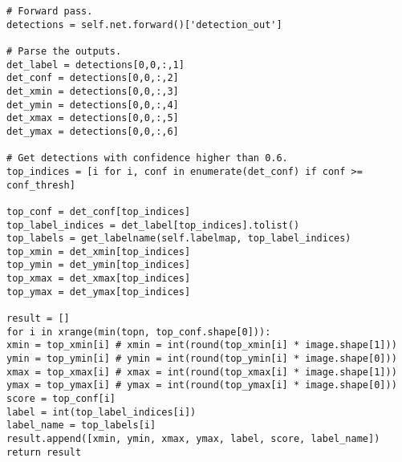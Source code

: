 \documentclass[12pt,paper=a4]{report}
\begin{document}
\begin{lstlisting}
# Forward pass.
detections = self.net.forward()['detection_out']

# Parse the outputs.
det_label = detections[0,0,:,1]
det_conf = detections[0,0,:,2]
det_xmin = detections[0,0,:,3]
det_ymin = detections[0,0,:,4]
det_xmax = detections[0,0,:,5]
det_ymax = detections[0,0,:,6]

# Get detections with confidence higher than 0.6.
top_indices = [i for i, conf in enumerate(det_conf) if conf >= conf_thresh]

top_conf = det_conf[top_indices]
top_label_indices = det_label[top_indices].tolist()
top_labels = get_labelname(self.labelmap, top_label_indices)
top_xmin = det_xmin[top_indices]
top_ymin = det_ymin[top_indices]
top_xmax = det_xmax[top_indices]
top_ymax = det_ymax[top_indices]

result = []
for i in xrange(min(topn, top_conf.shape[0])):
xmin = top_xmin[i] # xmin = int(round(top_xmin[i] * image.shape[1]))
ymin = top_ymin[i] # ymin = int(round(top_ymin[i] * image.shape[0]))
xmax = top_xmax[i] # xmax = int(round(top_xmax[i] * image.shape[1]))
ymax = top_ymax[i] # ymax = int(round(top_ymax[i] * image.shape[0]))
score = top_conf[i]
label = int(top_label_indices[i])
label_name = top_labels[i]
result.append([xmin, ymin, xmax, ymax, label, score, label_name])
return result


\end{lstlisting}
\end{document}

